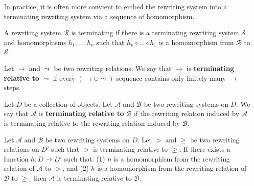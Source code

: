 \documentclass{book}
\begin{document}
    In practice, it is often more convient to embed the rewriting system into a terminating rewriting system via a sequence of homomorphism.
    \begin{corollary}
      A rewriting system $\mathcal{R}$ is terminating if there is a terminating rewriting system $\mathcal{S}$ and homomorphisms $h_1,\ldots, h_n$ such that $h_n \circ \ldots \circ h_1$ is a homomorphism from $\mathcal{R}$ to $\mathcal{S}$.
    \end{corollary}
    
    \begin{definition}
        \label{def:rewriting_relation:relative_termination}
        Let \( \to \) and \( \leadsto \) be two rewriting relations. We say that \(\to\) is \textbf{terminating relative to} \(\leadsto\) if every \( \left(\to \cup \leadsto \right) \)-sequence contains only finitely many \(\to\)-steps.
    \end{definition}
    
    \begin{definition}
        \label{def:rewriting_system:relative_termination}
        Let $D$ be a collection of objects.
        Let \( \mathcal{A} \) and \( \mathcal{B} \) be two rewriting systems on $D$. We say that \(\mathcal{A}\) is \textbf{terminating relative to} \(\mathcal{B}\) if the rewriting relation induced by \(\mathcal{A}\) is terminating relative to the rewriting relation induced by \(\mathcal{B}\).
    \end{definition}
    
    \begin{definition}
        \label{def:rewriting_system:proving_relative_termination}
        Let \( \mathcal{A} \) and \( \mathcal{B} \) be two rewriting systems on $D$. Let $>$ and $\geq$ be two rewriting relations on $D'$ such that $>$ is terminating relative to $\geq$. If there exists a function $h : D \to D'$ such that: (1) $h$ is a homomorphism from the rewriting relation of \(\mathcal{A}\) to $>$, and (2) $h$ is a homomorphism from the rewriting relation of \(\mathcal{B}\) to $\geq$, then \(\mathcal{A}\) is terminating relative to \(\mathcal{B}\).
    \end{definition}
    
\end{document}
